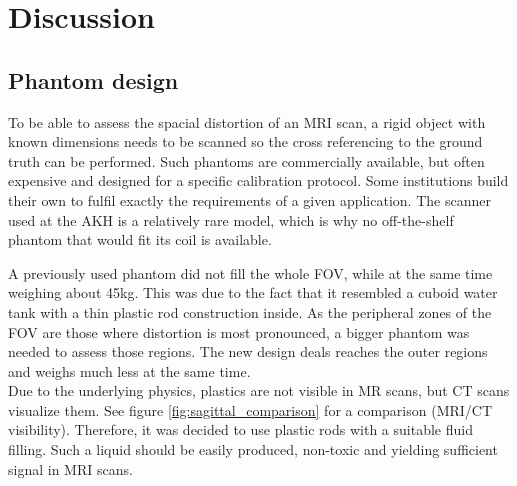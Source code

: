 


\chapter{Discussion}

\section{Phantom design}

To be able to assess the spacial distortion of an MRI scan, a rigid object with known dimensions needs to be scanned so the cross referencing to the ground truth can be performed.
Such phantoms are commercially available, but often expensive and designed for a specific calibration protocol.
Some institutions build their own to fulfil exactly the requirements of a given application.
The scanner used at the AKH is a relatively rare model, which is why no off-the-shelf phantom that would fit its coil is available.

A previously used phantom did not fill the whole FOV, while at the same time weighing about 45kg.
This was due to the fact that it resembled a cuboid water tank with a thin plastic rod construction inside.
As the peripheral zones of the FOV are those where distortion is most pronounced, a bigger phantom was needed to assess those regions.
The new design deals reaches the outer regions and weighs much less at the same time.\\

Due to the underlying physics, plastics are not visible in MR scans, but CT scans visualize them. 
See figure \ref{fig:sagittal_comparison} for a comparison (MRI/CT visibility).
Therefore, it was decided to use plastic rods with a suitable fluid filling.
Such a liquid should be easily produced, non-toxic and yielding sufficient signal in MRI scans.

